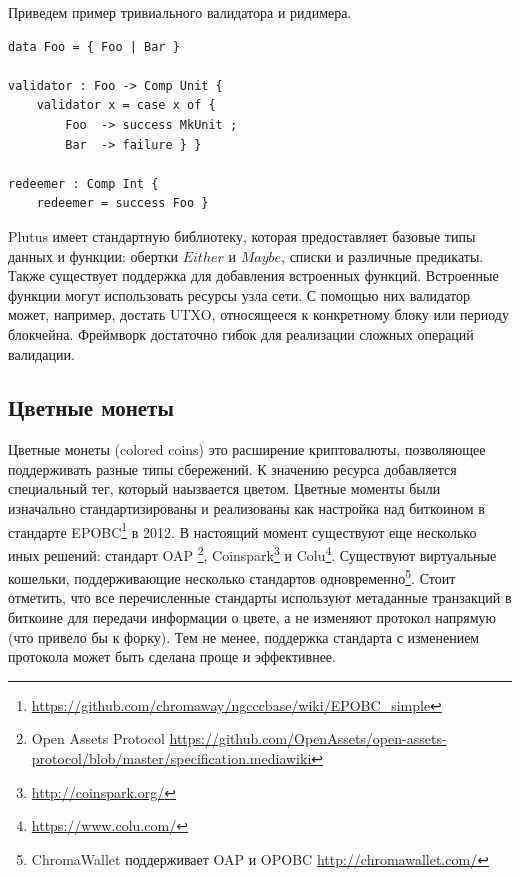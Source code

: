 \documentclass[specification,annotation]{itmo-student-thesis}
\begin{document}
Приведем пример тривиального валидатора и ридимера.

\begin{lstlisting}[float=!h,caption={Пример пары валидатор/ридимер на Plutus}]
data Foo = { Foo | Bar }

validator : Foo -> Comp Unit {
    validator x = case x of {
        Foo  -> success MkUnit ;
        Bar  -> failure } }

redeemer : Comp Int {
    redeemer = success Foo }
\end{lstlisting}

Plutus имеет стандартную библиотеку, которая предоставляет базовые
типы данных и функции: обертки $Either$ и $Maybe$, списки и различные
предикаты. Также существует поддержка для добавления встроенных
функций. Встроенные функции могут использовать ресурсы узла сети. С
помощью них валидатор может, например, достать UTXO, относящееся к
конкретному блоку или периоду блокчейна. Фреймворк достаточно гибок
для реализации сложных операций валидации.

\subsection{Цветные монеты}

Цветные монеты (colored coins) это расширение криптовалюты,
позволяющее поддерживать разные типы сбережений. К значению ресурса
добавляется специальный тег, который наызвается цветом. Цветные
моменты были изначально стандартизированы и реализованы как настройка
над биткоином в стандарте
EPOBC\footnote{\url{https://github.com/chromaway/ngcccbase/wiki/EPOBC_simple}}
в 2012. В настоящий момент существуют еще несколько иных решений:
стандарт OAP \footnote{Open Assets Protocol
  \url{https://github.com/OpenAssets/open-assets-protocol/blob/master/specification.mediawiki}},
Coinspark\footnote{\url{http://coinspark.org/}} и
Colu\footnote{\url{https://www.colu.com/}}. Существуют виртуальные
кошельки, поддерживающие несколько стандартов
одновременно\footnote{ChromaWallet поддерживает OAP и OPOBC
  \url{http://chromawallet.com/}}. Стоит отметить, что все
перечисленные стандарты используют метаданные транзакций в биткоине
для передачи информации о цвете, а не изменяют протокол напрямую (что
привело бы к форку). Тем не менее, поддержка стандарта с изменением
протокола может быть сделана проще и эффективнее.
\end{document}
